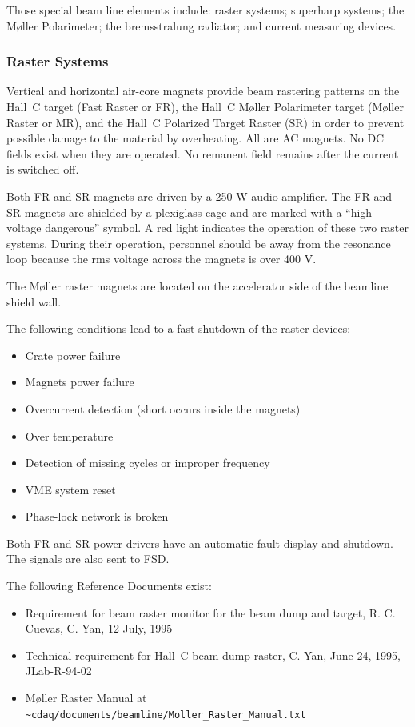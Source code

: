 Those special beam line elements include:  raster systems; superharp systems; the M\o ller 
Polarimeter; the bremsstralung radiator; and current measuring devices.

\subsubsection{Raster Systems}

Vertical and horizontal air-core magnets provide beam
rastering patterns on the Hall~C target (Fast Raster or FR), the
Hall~C M\o ller Polarimeter target (M\o ller Raster or MR), and the Hall~C 
Polarized Target Raster (SR) in order to prevent possible damage to the material by
overheating. All are AC magnets. No DC fields 
exist when they are operated. No remanent field remains after
the current is switched off.

Both FR and SR magnets are driven by a 250 W audio amplifier. The FR
and SR magnets are shielded by a plexiglass cage and are marked with a
``high voltage dangerous'' symbol.  A red light indicates the
operation of these two raster systems. During their operation, personnel
should be away from the resonance loop because the rms voltage across
the magnets is over 400 V.

The M\o ller raster magnets are located on the accelerator side of the
beamline shield wall.

The following conditions lead to a fast shutdown of the raster devices:
\begin{itemize}
\item{Crate power failure}
\item{Magnets power failure}
\item{Overcurrent detection (short occurs inside the magnets)}
\item{Over temperature}
\item{Detection of missing cycles or improper frequency}
\item{VME system reset}
\item{Phase-lock network is broken}
\end{itemize}

\noindent Both FR and SR power drivers have an automatic fault display and
shutdown. The signals are also sent to FSD.

The following Reference Documents exist:
\begin{itemize}
\item{Requirement for beam raster monitor for the beam dump and target,
R. C. Cuevas, C. Yan, 12 July, 1995}
\item{Technical requirement for Hall~C beam dump raster,
C. Yan, June 24, 1995, JLab-R-94-02}
\item{M\o ller Raster Manual at \verb|~cdaq/documents/beamline/Moller_Raster_Manual.txt|}
\end{itemize}

